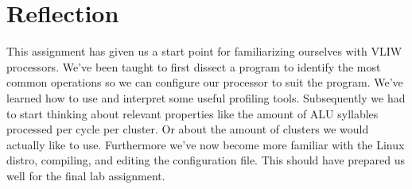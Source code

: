 \section{Reflection}
This assignment has given us a start point for familiarizing ourselves with VLIW processors. We've been taught to first dissect a program to identify the most common operations so we can configure our processor to suit the program. We've learned how to use and interpret some useful profiling tools. Subsequently we had to start thinking about relevant properties like the amount of ALU syllables processed per cycle per cluster. Or about the amount of clusters we would actually like to use. Furthermore we've now become more familiar with the Linux distro, compiling, and editing the configuration file. This should have prepared us well for the final lab assignment.